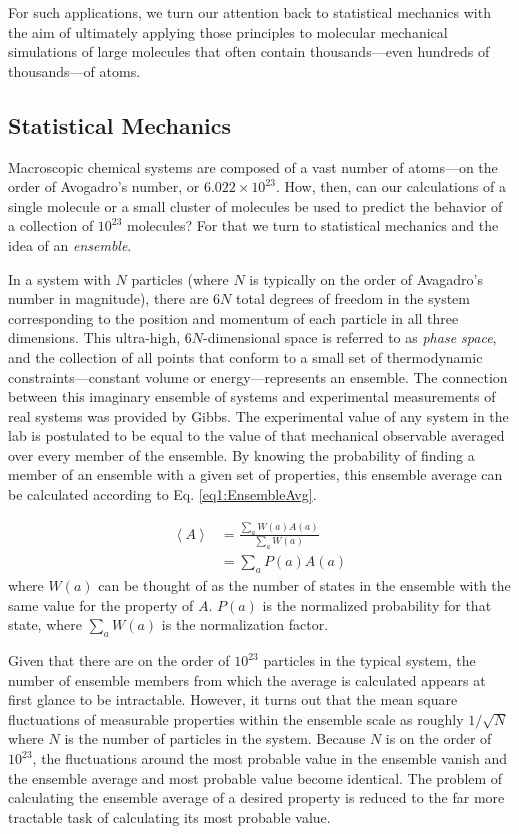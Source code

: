 For such applications, we turn our attention back to statistical mechanics with
the aim of ultimately applying those principles to molecular mechanical
simulations of large molecules that often contain thousands---even hundreds of
thousands---of atoms.

\subsection{Statistical Mechanics}

Macroscopic chemical systems are composed of a vast number of atoms---on the
order of Avogadro's number, or $6.022 \times 10 ^ {23}$. How, then, can our
calculations of a single molecule or a small cluster of molecules be used to
predict the behavior of a collection of $10 ^ {23}$ molecules? For that we turn
to statistical mechanics and the idea of an \emph{ensemble}.

In a system with $N$ particles (where $N$ is typically on the order of
Avagadro's number in magnitude), there are $6 N$ total degrees of freedom in the
system corresponding to the position and momentum of each particle in all three
dimensions. This ultra-high, $6N$-dimensional space is referred to as
\emph{phase space}, and the collection of all points that conform to a small set
of thermodynamic constraints---\eg constant volume or energy---represents an
ensemble. \cite{McQuarrie_Book_StatMech_1973} The connection between this
imaginary ensemble of systems and experimental measurements of real systems was
provided by Gibbs. The experimental value of any system in the lab is postulated
to be equal to the value of that mechanical observable averaged over every
member of the ensemble. \cite{McQuarrie_Book_StatMech_1973} By knowing the
probability of finding a member of an ensemble with a given set of properties,
this ensemble average can be calculated according to Eq. \ref{eq1:EnsembleAvg}.

\begin{align}
   \left < A \right > & = \frac {\sum_a W(a) A(a)} {\sum_a W(a)} \nonumber \\
                      & = \sum_a P(a) A(a)
   \label{eq1:EnsembleAvg}
\end{align}
where $W(a)$ can be thought of as the number of states in the ensemble with the
same value for the property of $A$. $P(a)$ is the normalized probability for
that state, where $\sum_a W(a)$ is the normalization factor.

Given that there are on the order of $10^{23}$ particles in the typical system,
the number of ensemble members from which the average is calculated appears at
first glance to be intractable. However, it turns out that the mean square
fluctuations of measurable properties within the ensemble scale as roughly $1 /
\sqrt{N}$ where $N$ is the number of particles in the system.  Because $N$ is on
the order of $10 ^ {23}$, the fluctuations around the most probable value in the
ensemble vanish and the ensemble average and most probable value become
identical. The problem of calculating the ensemble average of a desired property
is reduced to the far more tractable task of calculating its most probable
value.

